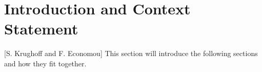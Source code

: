 \section{Introduction and Context Statement} [S. Krughoff and F. Economou]
This section will introduce the following sections and how they fit together.
